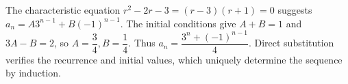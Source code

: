 The characteristic equation $ r^2-2r-3=(r-3)(r+1)=0 $ suggests $ a_n=A3^{n-1}+B(-1)^{n-1}$. The initial conditions give $ A+B=1 $ and $ 3A-B=2 $, so $ A=\dfrac{3}{4},B=\dfrac{1}{4}$. Thus $\boxed{a_n=\dfrac{3^n+(-1)^{n-1}}{4}}$. Direct substitution verifies the recurrence and initial values, which uniquely determine the sequence by induction.
